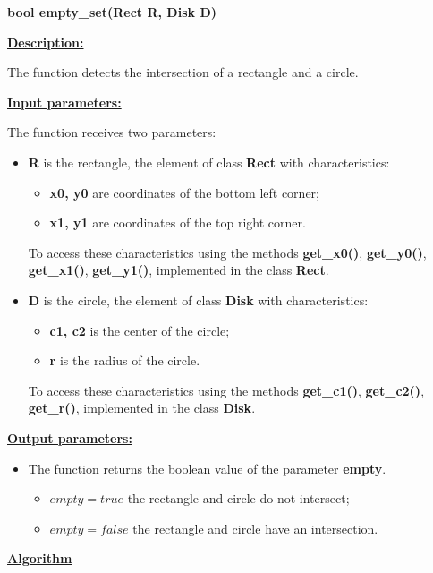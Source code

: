 \documentclass{report}
\begin{document}
	\begin{center}{\parindent =0pt \bfseries bool empty\_set(Rect R, Disk D)}\end{center}
	\parindent=0pt
	\underline { \bfseries{Description:}}
	
	The function detects the intersection of a rectangle and a circle.
	
	{\bfseries\underline{Input parameters:}}
	
	The function receives two parameters:
	
	\begin{itemize}
		\item {\bfseries	R} is the rectangle, the element of class {\bfseries Rect} with characteristics:
		\begin{itemize}
			\item {\bfseries x0, y0} are coordinates of the bottom left corner;
			\item {\bfseries x1, y1} are coordinates of the top right corner.
		\end{itemize}
	
		To access these characteristics using the methods  {\bfseries get\_x0()}, {\bfseries get\_y0()}, {\bfseries get\_x1()}, {\bfseries get\_y1()}, implemented in the class {\bfseries Rect}.
		
		
		\item {\bfseries D}  is the circle, the element of class {\bfseries Disk} with characteristics:
		\begin{itemize}
			\item {\bfseries c1, c2}  is the center of the circle;
	
			\item {\bfseries r}  is  the radius of the circle.
		\end{itemize}
		To access these characteristics using the methods {\bfseries get\_c1()}, {\bfseries get\_c2()}, {\bfseries get\_r()}, implemented in the class {\bfseries Disk}.
		
	\end{itemize}
	
	{\bfseries\underline{Output parameters:}}
	\begin{itemize}
		\item The function returns the boolean value of the parameter {\bfseries empty}.
		\begin{itemize}
		 \item $empty = true$ the rectangle and circle do not intersect;
		 \item $ empty = false$ the rectangle and circle have an intersection.
		\end{itemize}
	\end{itemize}
	{\bfseries\underline{Algorithm}}
	
\end{document}
